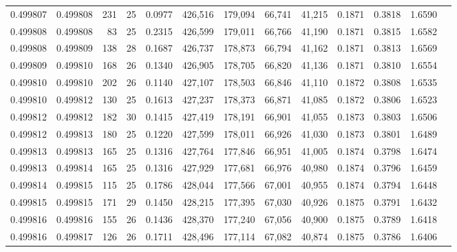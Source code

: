 \begin{tabular}{rrrrrrrrrrrrr}
0.499807 & 0.499808 & 231 &  25 &                                     0.0977 & 426,516 & 179,094 &  66,741 &  41,215 & 0.1871 & 0.3818 & 1.6590 \\
0.499808 & 0.499808 &  83 &  25 &                                     0.2315 & 426,599 & 179,011 &  66,766 &  41,190 & 0.1871 & 0.3815 & 1.6582 \\
0.499808 & 0.499809 & 138 &  28 &                                     0.1687 & 426,737 & 178,873 &  66,794 &  41,162 & 0.1871 & 0.3813 & 1.6569 \\
0.499809 & 0.499810 & 168 &  26 &                                     0.1340 & 426,905 & 178,705 &  66,820 &  41,136 & 0.1871 & 0.3810 & 1.6554 \\
0.499810 & 0.499810 & 202 &  26 &                                     0.1140 & 427,107 & 178,503 &  66,846 &  41,110 & 0.1872 & 0.3808 & 1.6535 \\
0.499810 & 0.499812 & 130 &  25 &                                     0.1613 & 427,237 & 178,373 &  66,871 &  41,085 & 0.1872 & 0.3806 & 1.6523 \\
0.499812 & 0.499812 & 182 &  30 &                                     0.1415 & 427,419 & 178,191 &  66,901 &  41,055 & 0.1873 & 0.3803 & 1.6506 \\
0.499812 & 0.499813 & 180 &  25 &                                     0.1220 & 427,599 & 178,011 &  66,926 &  41,030 & 0.1873 & 0.3801 & 1.6489 \\
0.499813 & 0.499813 & 165 &  25 &                                     0.1316 & 427,764 & 177,846 &  66,951 &  41,005 & 0.1874 & 0.3798 & 1.6474 \\
0.499813 & 0.499814 & 165 &  25 &                                     0.1316 & 427,929 & 177,681 &  66,976 &  40,980 & 0.1874 & 0.3796 & 1.6459 \\
0.499814 & 0.499815 & 115 &  25 &                                     0.1786 & 428,044 & 177,566 &  67,001 &  40,955 & 0.1874 & 0.3794 & 1.6448 \\
0.499815 & 0.499815 & 171 &  29 &                                     0.1450 & 428,215 & 177,395 &  67,030 &  40,926 & 0.1875 & 0.3791 & 1.6432 \\
0.499816 & 0.499816 & 155 &  26 &                                     0.1436 & 428,370 & 177,240 &  67,056 &  40,900 & 0.1875 & 0.3789 & 1.6418 \\
0.499816 & 0.499817 & 126 &  26 &                                     0.1711 & 428,496 & 177,114 &  67,082 &  40,874 & 0.1875 & 0.3786 & 1.6406 \\

\end{tabular}
